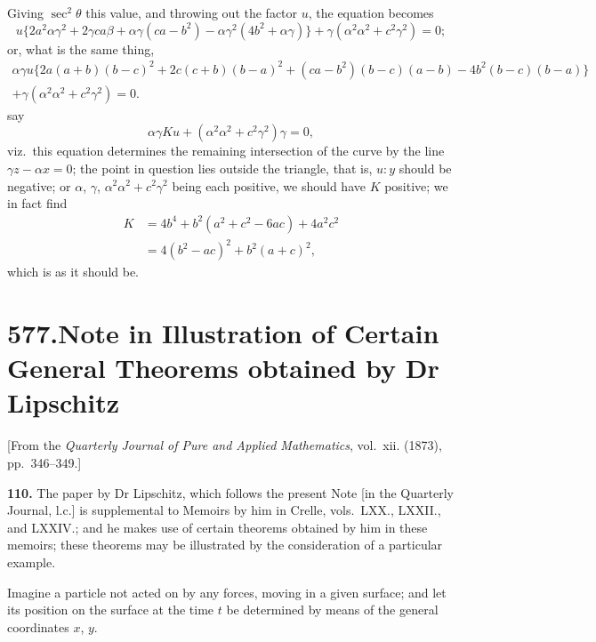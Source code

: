 \documentclass[11pt,a4paper]{article}
\theoremstyle{plain}
\begin{document}
Giving $\sec^2\theta$ this value, and throwing out the factor $u$, the equation becomes
\[
u\{2a^2\alpha\gamma^2 + 2\gamma ca\beta + \alpha\gamma(ca - b^2) - \alpha\gamma^2(4b^2 + \alpha\gamma)\} + \gamma(\alpha^2\alpha^2 + c^2\gamma^2) = 0;
\]
or, what is the same thing,
\begin{multline*}
\alpha\gamma u\{2a(a + b)(b - c)^2 + 2c(c + b)(b - a)^2 + (ca - b^2)(b - c)(a - b) - 4b^2(b - c)(b - a)\} \\
+ \gamma(\alpha^2\alpha^2 + c^2\gamma^2) = 0.
\end{multline*}
say
\[
\alpha\gamma Ku + (\alpha^2\alpha^2 + c^2\gamma^2)\gamma = 0,
\]
viz.\ this equation determines the remaining intersection of the curve by the line $\gamma z - \alpha x = 0$; the point in question lies outside the triangle, that is, $u : y$ should be negative; or $\alpha$, $\gamma$, $\alpha^2\alpha^2 + c^2\gamma^2$ being each positive, we should have $K$ positive; we in fact find
\begin{align*}
K &= 4b^4 + b^2(a^2 + c^2 - 6ac) + 4a^2c^2 \\
&= 4(b^2 - ac)^2 + b^2(a + c)^2,
\end{align*}
which is as it should be.


\newpage
\section*{577.\quad Note in Illustration of Certain General Theorems obtained by Dr Lipschitz}

\begin{flushright}
\small[From the \textit{Quarterly Journal of Pure and Applied Mathematics}, vol.~xii. (1873), pp.~346--349.]
\end{flushright}

\noindent\textbf{110.} The paper by Dr Lipschitz, which follows the present Note [in the Quarterly Journal, l.c.] is supplemental to Memoirs by him in Crelle, vols.~LXX., LXXII., and LXXIV.; and he makes use of certain theorems obtained by him in these memoirs; these theorems may be illustrated by the consideration of a particular example.

Imagine a particle not acted on by any forces, moving in a given surface; and let its position on the surface at the time $t$ be determined by means of the general coordinates $x$, $y$.
\end{document}
